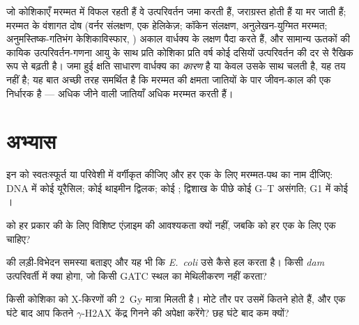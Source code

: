 \begin{remark}[मरम्मत और वार्धक्य]\label{rem:b3:dna-repair:ageing}
जो कोशिकाएँ मरम्मत में विफल रहती हैं वे उत्परिवर्तन जमा करती हैं,
जराग्रस्त होती हैं या मर जाती हैं; मरम्मत के वंशागत दोष (वर्नर संलक्षण,
एक हेलिकेज़; कॉकेन संलक्षण, अनुलेखन-युग्मित मरम्मत; अनुमस्तिष्क-गतिभंग
केशिकाविस्फार, ) अकाल वार्धक्य के लक्षण पैदा करते हैं, और सामान्य
ऊतकों की कायिक उत्परिवर्तन-गणना आयु के साथ प्रति कोशिका प्रति वर्ष कोई
दसियों उत्परिवर्तन की दर से रैखिक रूप से बढ़ती है। जमा हुई क्षति
साधारण वार्धक्य का \emph{कारण} है या केवल उसके साथ चलती है, यह तय नहीं
है; यह बात अच्छी तरह समर्थित है कि मरम्मत की क्षमता जातियों के पार
जीवन-काल की एक निर्धारक है --- अधिक जीने वाली जातियाँ अधिक मरम्मत करती हैं।
\end{remark}

\section{अभ्यास}

\begin{exercise}[$\star$]\label{exo:b3:dna-repair:1}
इन  को स्वतःस्फूर्त या परिवेशी में वर्गीकृत कीजिए और हर एक के
लिए मरम्मत-पथ का नाम दीजिए: DNA में कोई यूरैसिल; कोई थाइमीन द्विलक; कोई
; द्विशाख के पीछे कोई G--T असंगति; G1 में कोई ।
\end{exercise}

\begin{exercise}[$\star$]\label{exo:b3:dna-repair:2}
 को हर प्रकार की  के लिए विशिष्ट
एंज़ाइम की आवश्यकता क्यों नहीं, जबकि  को हर एक के
लिए एक  चाहिए?
\end{exercise}

\begin{exercise}[$\star$]\label{exo:b3:dna-repair:3}
 की लड़ी-विभेदन समस्या बताइए और यह भी कि
\emph{E.~coli} उसे कैसे हल करता है। किसी \emph{dam} उत्परिवर्ती में
क्या होगा, जो किसी GATC स्थल का मेथिलीकरण नहीं करता?
\end{exercise}

\begin{exercise}[$\star$]\label{exo:b3:dna-repair:4}
किसी कोशिका को X-किरणों की \qty{2}{Gy} मात्रा मिलती है। मोटे तौर पर
उसमें कितने  होते हैं, और एक घंटे बाद आप कितने
$\gamma$-H2AX केंद्र गिनने की अपेक्षा करेंगे? छह घंटे बाद कम क्यों?
\end{exercise}

